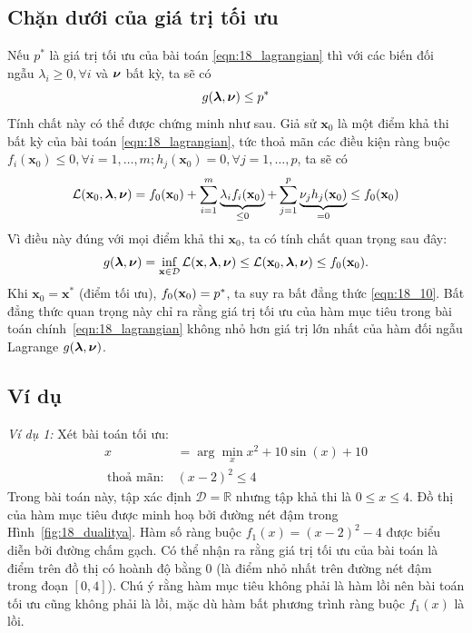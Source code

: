 \subsection{Chặn dưới của giá trị tối ưu }
Nếu $p^*$ là giá trị tối ưu của bài toán
\eqref{eqn:18_lagrangian} thì với các biến đối ngẫu $\lambda_i \geq 0, \forall
i$ và $\boldsymbol{\nu}$ {bất kỳ}, ta sẽ có
\begin{equation}
\label{eqn:18_10}
g(\boldsymbol{\lambda}, \boldsymbol{\nu}) \leq p^*
\end{equation}
Tính chất này có thể được chứng minh như sau. Giả sử $\mathbf{x}_0$ là một
điểm khả thi bất kỳ của bài toán \eqref{eqn:18_lagrangian}, tức
thoả mãn các điều kiện ràng buộc $f_i(\mathbf{x}_0) \leq 0, \forall i = 1,
\dots, m; h_j(\mathbf{x}_0) = 0, \forall j = 1, \dots, p$, ta sẽ có
\begin{equation*}
\mathcal{L}(\mathbf{x}_0, \boldsymbol{\lambda}, \boldsymbol{\nu}) = f_0(\mathbf{x}_0) + \sum_{i=1}^m
\underbrace{\lambda_if_i(\mathbf{x}_0)}_{\leq 0}+ \sum_{j=1}^p \underbrace{\nu_j
h_j(\mathbf{x}_0)}_{= 0} \leq f_0(\mathbf{x}_0)
\end{equation*}
Vì điều này đúng với mọi điểm khả thi $\mathbf{x}_0$, ta có tính chất quan trọng sau đây:
\begin{equation*}
g(\boldsymbol{\lambda}, \boldsymbol{\nu}) = \inf_{\mathbf{x} \in \mathcal{D}} \mathcal{L}(\mathbf{x}, \boldsymbol{\lambda}, \boldsymbol{\nu}) \leq \mathcal{L}(\mathbf{x}_0, \boldsymbol{\lambda}, \boldsymbol{\nu}) \leq f_0(\mathbf{x}_0).
\end{equation*}
Khi $\mathbf{x}_0 = \mathbf{x}^*$ (điểm tối ưu), $f_0(\mathbf{x}_0) = p^*$, ta suy ra
bất đẳng thức \eqref{eqn:18_10}.
Bất đẳng thức quan trọng này chỉ ra rằng giá trị tối ưu của hàm mục tiêu trong
bài toán chính~\eqref{eqn:18_lagrangian} không nhỏ hơn giá trị lớn nhất của hàm
đối
ngẫu Lagrange $g(\boldsymbol{\lambda}, \boldsymbol{\nu})$.

\subsection{Ví dụ }

\textit{Ví dụ 1:} Xét bài toán tối ưu:
\begin{equation}
\begin{aligned}
x&= \arg\min_{x} x^2 + 10\sin(x) + 10 \\\
\text{thoả mãn:}~& (x-2)^2 \leq 4
\end{aligned}
\end{equation}
Trong bài toán này, tập xác định $\mathcal{D} = \mathbb{R}$ nhưng
tập khả thi là $0 \leq x \leq 4$. Đồ thị của hàm mục tiêu được minh
hoạ bởi đường nét đậm trong Hình~\ref{fig:18_dualitya}. Hàm số ràng buộc
$f_1(x) = (x-2)^2 - 4$ được biểu diễn bởi đường chấm gạch. Có thể nhận ra rằng giá trị tối ưu
của bài toán là điểm trên đồ thị có hoành độ bằng 0 (là
điểm nhỏ nhất trên đường nét đậm trong đoạn $[0, 4]$). Chú ý rằng hàm mục tiêu không phải là hàm lồi nên bài toán tối ưu cũng
không phải là lồi, mặc dù hàm bất phương trình ràng buộc $f_1(x)$ là lồi.

